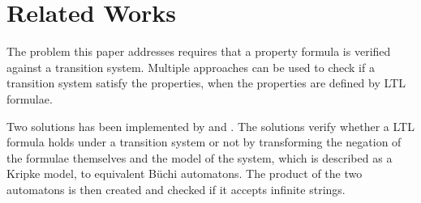 \section{Related Works}
The problem this paper addresses requires that a property formula is verified against a transition system. Multiple approaches can be used to check if a transition system satisfy the properties, when the properties are defined by LTL formulae.

Two solutions has been implemented by \cite{jpsember} and \cite{serejke}. The solutions verify whether a LTL formula holds under a transition system or not by transforming the negation of the formulae themselves and the model of the system, which is described as a Kripke model, to equivalent Büchi automatons. The product of the two automatons is then created and checked if it accepts infinite strings.




